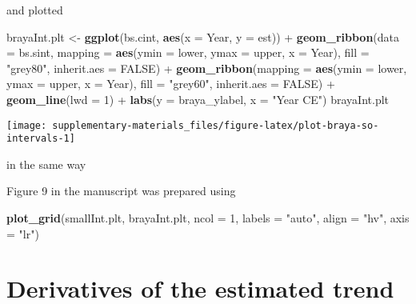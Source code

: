\documentclass[12pt,]{article}
\newenvironment{Shaded}{\begin{snugshade}}{\end{snugshade}}
\newcommand{\KeywordTok}[1]{\textcolor[rgb]{0.13,0.29,0.53}{\textbf{{#1}}}}
\newcommand{\DataTypeTok}[1]{\textcolor[rgb]{0.13,0.29,0.53}{{#1}}}
\newcommand{\DecValTok}[1]{\textcolor[rgb]{0.00,0.00,0.81}{{#1}}}
\newcommand{\StringTok}[1]{\textcolor[rgb]{0.31,0.60,0.02}{{#1}}}
\newcommand{\OtherTok}[1]{\textcolor[rgb]{0.56,0.35,0.01}{{#1}}}
\newcommand{\NormalTok}[1]{{#1}}
\begin{document}
and plotted

\begin{Shaded}
\begin{Highlighting}[]
\NormalTok{brayaInt.plt <-}\StringTok{ }\KeywordTok{ggplot}\NormalTok{(bs.cint, }\KeywordTok{aes}\NormalTok{(}\DataTypeTok{x =} \NormalTok{Year, }\DataTypeTok{y =} \NormalTok{est)) +}
\StringTok{    }\KeywordTok{geom_ribbon}\NormalTok{(}\DataTypeTok{data =} \NormalTok{bs.sint,}
                \DataTypeTok{mapping =} \KeywordTok{aes}\NormalTok{(}\DataTypeTok{ymin =} \NormalTok{lower, }\DataTypeTok{ymax =} \NormalTok{upper, }\DataTypeTok{x =} \NormalTok{Year),}
                \DataTypeTok{fill =} \StringTok{"grey80"}\NormalTok{, }\DataTypeTok{inherit.aes =} \OtherTok{FALSE}\NormalTok{) +}
\StringTok{    }\KeywordTok{geom_ribbon}\NormalTok{(}\DataTypeTok{mapping =} \KeywordTok{aes}\NormalTok{(}\DataTypeTok{ymin =} \NormalTok{lower, }\DataTypeTok{ymax =} \NormalTok{upper, }\DataTypeTok{x =} \NormalTok{Year),}
                \DataTypeTok{fill =} \StringTok{"grey60"}\NormalTok{, }\DataTypeTok{inherit.aes =} \OtherTok{FALSE}\NormalTok{) +}
\StringTok{    }\KeywordTok{geom_line}\NormalTok{(}\DataTypeTok{lwd =} \DecValTok{1}\NormalTok{) +}
\StringTok{    }\KeywordTok{labs}\NormalTok{(}\DataTypeTok{y =} \NormalTok{braya_ylabel, }\DataTypeTok{x =} \StringTok{"Year CE"}\NormalTok{)}
\NormalTok{brayaInt.plt}
\end{Highlighting}
\end{Shaded}

\begin{center}\texttt{[image: supplementary-materials\_files/figure-latex/plot-braya-so-intervals-1]} \end{center}

in the same way

Figure 9 in the manuscript was prepared using

\begin{Shaded}
\begin{Highlighting}[]
\KeywordTok{plot_grid}\NormalTok{(smallInt.plt, brayaInt.plt, }\DataTypeTok{ncol =} \DecValTok{1}\NormalTok{, }\DataTypeTok{labels =} \StringTok{"auto"}\NormalTok{,}
          \DataTypeTok{align =} \StringTok{"hv"}\NormalTok{, }\DataTypeTok{axis =} \StringTok{"lr"}\NormalTok{)}
\end{Highlighting}
\end{Shaded}

\section{Derivatives of the estimated
trend}\label{derivatives-of-the-estimated-trend}
\end{document}
